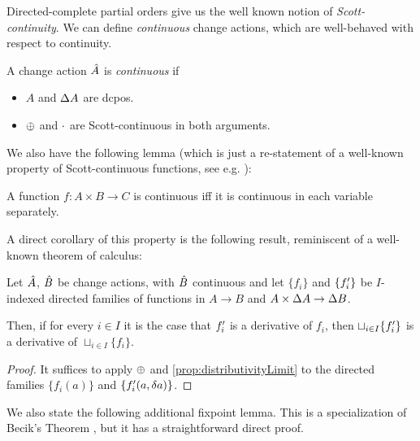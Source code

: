 Directed-complete partial orders give us the well known notion of
\emph{Scott-continuity}. We can define \emph{continuous} change actions,
which are well-behaved with respect to continuity.

\begin{defn}
  A change action $\hat{A}$ is \emph{continuous} if
  \begin{itemize}
    \item $A$ and $\Delta A$ are dcpos.
    \item $\oplus$ and $\cdot$ are Scott-continuous in both arguments.
  \end{itemize}
\end{defn}

We also have the following lemma (which is just a re-statement of a well-known
property of Scott-continuous functions, see e.g. \cite[Lemma~3.2.6]{abramsky1994domain}):

\begin{prop}
  \label{prop:distributivityLimit}
  A function $f : A \times B \rightarrow C$ is continuous iff it is continuous in each variable separately.
\end{prop}

A direct corollary of this property is the following result, reminiscent of a well-known theorem of calculus:

\begin{corollary}
  \label{cor:diffContinuous}
  Let $\hat{A}$, $\hat{B}$ be change actions, with $\hat{B}$ continuous and let $\{f_i\}$ and $\{f_i'\}$ be
  $I$-indexed directed families of functions in $A \rightarrow B$ and $A \times \Delta A \rightarrow \Delta B$.

  Then, if for every $i \in I$ it is the case that $f_i'$ is a derivative of $f_i$, then $\sqcup_{i \in I} \{ f_i' \}$ is
  a derivative of $\sqcup_{i \in I} \{ f_i \}$.
\end{corollary}
\ifproofs
\begin{proof}
  It suffices to apply $\oplus$ and \cref{prop:distributivityLimit} to the directed families $\{ f_i(a) \}$ and
  $\{ f_i'(a, \delta a) \}$.
\end{proof}
\fi

We also state the following additional fixpoint lemma. This is a specialization of
Becik's Theorem \autocite[][section 10.1]{winskel1993formal}, but it has a straightforward direct proof.

